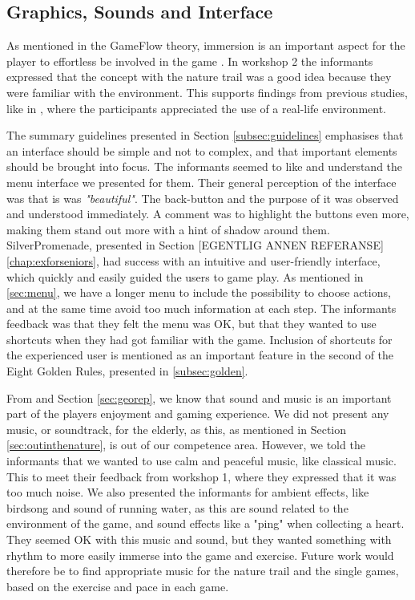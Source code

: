 \subsection{Graphics, Sounds and Interface}

As mentioned in the GameFlow theory, immersion is an important aspect for the player to effortless be involved in the game \cite{sweetser}. In workshop 2 the informants expressed that the concept with the nature trail was a good idea because they were familiar with the environment. This supports findings from previous studies, like in \cite{gerling2}, where the participants appreciated the use of a real-life environment.  

The summary guidelines presented in Section \ref{subsec:guidelines} emphasises that an interface should be simple and not to complex, and that important elements should be brought into focus. The informants seemed to like and understand the menu interface we presented for them. Their general perception of the interface was that is was \emph{"beautiful"}. The back-button and the purpose of it was observed and understood immediately. A comment was to highlight the buttons even more, making them stand out more with a hint of shadow around them. SilverPromenade, presented in Section [EGENTLIG ANNEN REFERANSE] \ref{chap:exforseniors}, had success with an intuitive and user-friendly interface, which quickly and easily guided the users to game play. As mentioned in \ref{sec:menu}, we have a longer menu to include the possibility to choose actions, and at the same time avoid too much information at each step. The informants feedback was that they felt the menu was OK, but that they wanted to use shortcuts when they had got familiar with the game. Inclusion of shortcuts for the experienced user is mentioned as an important feature in the second of the Eight Golden Rules, presented in \ref{subsec:golden}.

From \cite{schutzer} and Section \ref{sec:georep}, we know that sound and music is an important part of the players enjoyment and gaming experience. We did not present any music, or soundtrack, for the elderly, as this, as mentioned in Section \ref{sec:outinthenature}, is out of our competence area. However, we told the informants that we wanted to use calm and peaceful music, like classical music. This to meet their feedback from workshop 1, where they expressed that it was too much noise. We also presented the informants for ambient effects, like birdsong and sound of running water, as this are sound related to the environment of the game, and sound effects like a "ping" when collecting a heart. They seemed OK with this music and sound, but they wanted something with rhythm to more easily immerse into the game and exercise. Future work would therefore be to find appropriate music for the nature trail and the single games, based on the exercise and pace in each game. 

